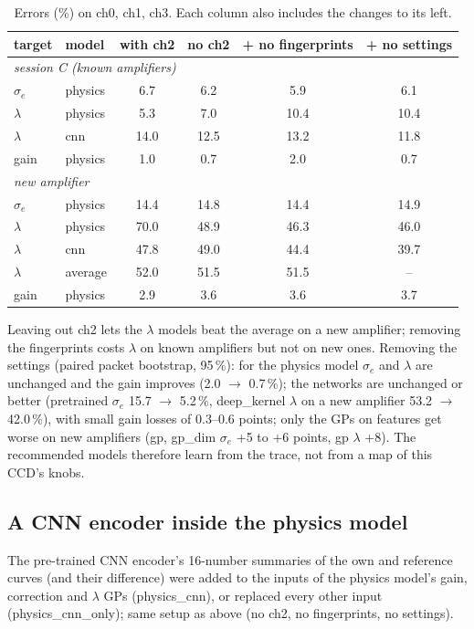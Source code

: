 \documentclass[11pt]{article}
\begin{document}
\begin{table}[h]
\centering\small
\begin{tabular}{llcccc}\toprule
target & model & with ch2 & no ch2 & + no fingerprints & + no settings\\\midrule
\multicolumn{6}{l}{\textit{session C (known amplifiers)}}\\
$\sigma_e$ & physics & 6.7 & 6.2 & 5.9 & 6.1\\
$\lambda$ & physics & 5.3 & 7.0 & 10.4 & 10.4\\
$\lambda$ & cnn & 14.0 & 12.5 & 13.2 & 11.8\\
gain & physics & 1.0 & 0.7 & 2.0 & 0.7\\
\multicolumn{6}{l}{\textit{new amplifier}}\\
$\sigma_e$ & physics & 14.4 & 14.8 & 14.4 & 14.9\\
$\lambda$ & physics & 70.0 & 48.9 & 46.3 & 46.0\\
$\lambda$ & cnn & 47.8 & 49.0 & 44.4 & 39.7\\
$\lambda$ & average & 52.0 & 51.5 & 51.5 & --\\
gain & physics & 2.9 & 3.6 & 3.6 & 3.7\\\bottomrule
\end{tabular}
\caption{Errors (\%) on ch0, ch1, ch3. Each column also includes the changes to its left.}
\label{tab:clean}
\end{table}

Leaving out ch2 lets the $\lambda$ models beat the average on a new amplifier; removing the fingerprints costs
$\lambda$ on known amplifiers but not on new ones. Removing the settings (paired packet bootstrap, 95\,\%): for the
physics model $\sigma_e$ and $\lambda$ are unchanged and the gain improves (2.0 $\to$ 0.7\,\%); the networks are
unchanged or better (pretrained $\sigma_e$ 15.7 $\to$ 5.2\,\%, deep\_kernel $\lambda$ on a new amplifier 53.2 $\to$
42.0\,\%), with small gain losses of 0.3--0.6 points; only the GPs on features get worse on new amplifiers (gp, gp\_dim
$\sigma_e$ +5 to +6 points, gp $\lambda$ +8). The recommended models therefore learn from the trace, not from a map of
this CCD's knobs.

\subsection{A CNN encoder inside the physics model}
The pre-trained CNN encoder's 16-number summaries of the own and reference curves (and their difference) were added to
the inputs of the physics model's gain, correction and $\lambda$ GPs (physics\_cnn), or replaced every other input
(physics\_cnn\_only); same setup as above (no ch2, no fingerprints, no settings).
\end{document}
